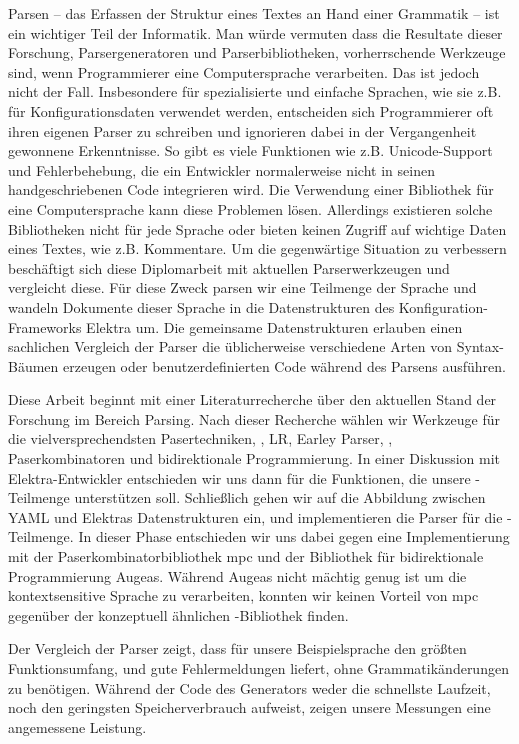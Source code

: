 \begin{kurzfassung}
Parsen – das Erfassen der Struktur eines Textes an Hand einer Grammatik – ist ein wichtiger Teil der Informatik. Man würde vermuten dass die Resultate dieser Forschung, Parsergeneratoren und Parserbibliotheken, vorherrschende Werkzeuge sind, wenn Programmierer eine Computersprache verarbeiten. Das ist jedoch nicht der Fall. Insbesondere für spezialisierte und einfache Sprachen, wie sie z.B. für Konfigurationsdaten verwendet werden, entscheiden sich Programmierer oft ihren eigenen Parser zu schreiben und ignorieren dabei in der Vergangenheit gewonnene Erkenntnisse. So gibt es viele Funktionen wie z.B. Unicode-Support und Fehlerbehebung, die ein Entwickler normalerweise nicht in seinen handgeschriebenen Code integrieren wird. Die Verwendung einer Bibliothek für eine Computersprache kann diese Problemen lösen. Allerdings existieren solche Bibliotheken nicht für jede Sprache oder bieten keinen Zugriff auf wichtige Daten eines Textes, wie z.B. Kommentare. Um die gegenwärtige Situation zu verbessern beschäftigt sich diese Diplomarbeit mit aktuellen Parserwerkzeugen und vergleicht diese. Für diese Zweck parsen wir eine Teilmenge der Sprache  und wandeln Dokumente dieser Sprache in die Datenstrukturen des Konfiguration-Frameworks Elektra um. Die gemeinsame Datenstrukturen erlauben einen sachlichen Vergleich der Parser die üblicherweise verschiedene Arten von Syntax-Bäumen erzeugen oder benutzerdefinierten Code während des Parsens ausführen.

Diese Arbeit beginnt mit einer Literaturrecherche über den aktuellen Stand der Forschung im Bereich Parsing. Nach dieser Recherche wählen wir Werkzeuge für die vielversprechendsten Pasertechniken, , LR, Earley Parser, , Paserkombinatoren und bidirektionale Programmierung. In einer Diskussion mit Elektra-Entwickler entschieden wir uns dann für die Funktionen, die unsere -Teilmenge unterstützen soll. Schließlich gehen wir auf die Abbildung zwischen YAML und Elektras Datenstrukturen ein, und implementieren die Parser für die -Teilmenge. In dieser Phase entschieden wir uns dabei gegen eine Implementierung mit der Paserkombinatorbibliothek mpc und der Bibliothek für bidirektionale Programmierung Augeas. Während Augeas nicht mächtig genug ist um die kontextsensitive Sprache  zu verarbeiten, konnten wir keinen Vorteil von mpc gegenüber der konzeptuell ähnlichen -Bibliothek  finden.

Der Vergleich der Parser zeigt, dass für unsere Beispielsprache  den größten Funktionsumfang, und gute Fehlermeldungen liefert, ohne Grammatikänderungen zu benötigen. Während der Code des Generators weder die schnellste Laufzeit, noch den geringsten Speicherverbrauch aufweist, zeigen unsere Messungen eine angemessene Leistung.
\end{kurzfassung}
